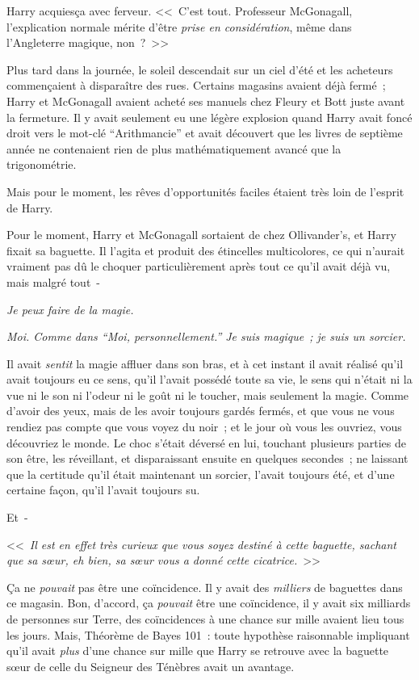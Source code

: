 Harry acquiesça avec ferveur. <<~C'est tout. Professeur McGonagall, l'explication normale mérite d'être \emph{prise en considération}, même dans l'Angleterre magique, non~?~>>

\later

Plus tard dans la journée, le soleil descendait sur un ciel d'été et les acheteurs commençaient à disparaître des rues. Certains magasins avaient déjà fermé~; Harry et McGonagall avaient acheté ses manuels chez Fleury et Bott juste avant la fermeture. Il y avait seulement eu une légère explosion quand Harry avait foncé droit vers le mot-clé “Arithmancie” et avait découvert que les livres de septième année ne contenaient rien de plus mathématiquement avancé que la trigonométrie.

Mais pour le moment, les rêves d'opportunités faciles étaient très loin de l'esprit de Harry.

Pour le moment, Harry et McGonagall sortaient de chez Ollivander's, et Harry fixait sa baguette. Il l'agita et produit des étincelles multicolores, ce qui n'aurait vraiment pas dû le choquer particulièrement après tout ce qu'il avait déjà vu, mais malgré tout~-

\emph{Je peux faire de la magie.}

\emph{Moi. Comme dans “Moi, personnellement.” Je suis magique~; je suis un sorcier.}

Il avait \emph{sentit} la magie affluer dans son bras, et à cet instant il avait réalisé qu'il avait toujours eu ce sens, qu'il l'avait possédé toute sa vie, le sens qui n'était ni la vue ni le son ni l'odeur ni le goût ni le toucher, mais seulement la magie. Comme d'avoir des yeux, mais de les avoir toujours gardés fermés, et que vous ne vous rendiez pas compte que vous voyez du noir~; et le jour où vous les ouvriez, vous découvriez le monde. Le choc s'était déversé en lui, touchant plusieurs parties de son être, les réveillant, et disparaissant ensuite en quelques secondes~; ne laissant que la certitude qu'il était maintenant un sorcier, l'avait toujours été, et d'une certaine façon, qu'il l'avait toujours su.

Et~-

<<~\emph{Il est en effet très curieux que vous soyez destiné à cette baguette, sachant que sa sœur, eh bien, sa sœur vous a donné cette cicatrice.}~>>

Ça ne \emph{pouvait} pas être une coïncidence. Il y avait des \emph{milliers} de baguettes dans ce magasin. Bon, d'accord, ça \emph{pouvait} être une coïncidence, il y avait six milliards de personnes sur Terre, des coïncidences à une chance sur mille avaient lieu tous les jours. Mais, Théorème de Bayes 101~: toute hypothèse raisonnable impliquant qu'il avait \emph{plus} d'une chance sur mille que Harry se retrouve avec la baguette sœur de celle du Seigneur des Ténèbres avait un avantage.

